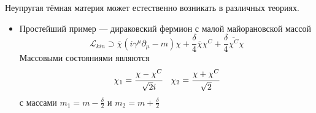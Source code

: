 Неупругая тёмная материя может естественно возникать в различных теориях.
\begin{itemize}
	\item Простейший пример --- дираковский фермион с малой майорановской массой
	\begin{equation*}
		\mathcal{L}_{kin} \supset \overline{\chi}( i\gamma^{\mu} \partial_{\mu} - m)\chi + 
		\frac{\delta}{4} \overline{\chi} \chi^C + \frac{\delta}{4} \overline{\chi^C} \chi %
	\end{equation*}
	Массовыми состояниями являются 
	\begin{eqnarray*}
		\chi_1 = \cfrac{\chi - \chi^C}{\sqrt{2} i} 
		\quad \chi_2 = \cfrac{\chi+ \chi^C}{\sqrt{2}}
	\end{eqnarray*}
	с массами $m_1 = m - \frac{\delta}{2}$ и  $m_2 = m + \frac{\delta}{2}$
\end{itemize}